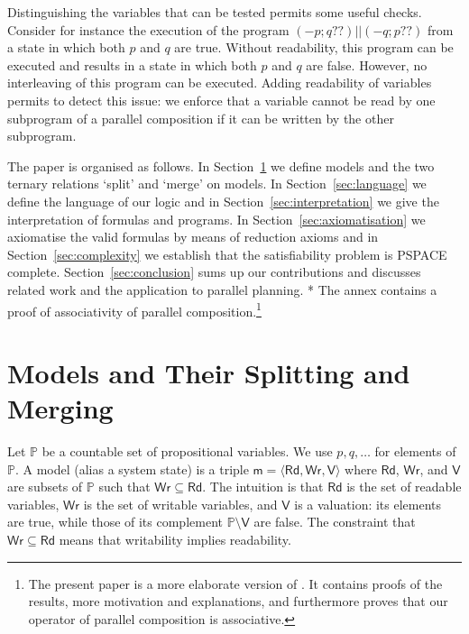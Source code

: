 \documentclass{llncs}
\newcommand{\atmset}{\mathtt{\mathbb X}}	%
\newcommand{\modl}{\mathsf m}
\newcommand{\pll}{ {||} }							%
\newcommand{\readable}[1]{\mathtt{r}_{#1}}
\newcommand{\readset}{\mathsf{Rd}}
\newcommand{\valuset}{\mathsf{V}}
\newcommand{\writable}[1]{\mathtt{w}_{#1}}
\newcommand{\writeset}{\mathsf{Wr}}
\newcommand{\testendo}{?\!\!?}			%
\newcommand{\ah}[1]{\**\marginpar{\textbf{AH:} #1}}
\newcommand{\assgnbotV}[1]{{\mathtt {-} #1}}
\newcommand{\propset}{\mathbb P}
\newcommand{\tuple}[1]{ \langle #1 \rangle}
\begin{document}
Distinguishing the variables that can be tested %
permits some useful checks.
Consider for instance the execution of the program $\left(\assgnbotV p ; q \testendo \right) \pll \left(\assgnbotV q ; p \testendo\right)$
from a state in which both $p$ and $q$ are true.
Without readability, this program can be executed and results in a state in which both $p$ and $q$ are false.
However, no interleaving of this program can be executed.
Adding readability of variables permits to detect this issue:
we enforce that a variable cannot be read by one subprogram of a parallel composition if it can be written by the other subprogram.

The paper is organised as follows.
In Section~\ref{sec:models} we define models and the two ternary relations `split' and `merge' on models. 
In Section~\ref{sec:language} we define the language of our logic and 
in Section~\ref{sec:interpretation} we give the interpretation of formulas and programs. 
In Section~\ref{sec:axiomatisation} we axiomatise the valid formulas by means of reduction axioms and
in Section~\ref{sec:complexity} we establish that the satisfiability problem is PSPACE complete. 
Section~\ref{sec:conclusion} sums up our contributions and discusses related work and the application to parallel planning. 
\ah{
reste ajoute
}
The annex contains a proof of associativity of parallel composition.\footnote{
The present paper is a more elaborate version of %
\cite{DBLP:conf/tap/BoudouHT19}. 
It contains proofs of the results, more motivation and explanations, and furthermore proves that our operator of parallel composition is associative. 
}


\section{Models and Their Splitting and Merging }\label{sec:models} 

Let $\propset$ be a countable set of propositional variables. 
We use $p, q,\ldots$ for elements of $\propset$. 
A model (alias a system state) is a %
triple $\modl = \tuple{\readset,\writeset,\valuset}$ 
where $\readset$, $\writeset$, and $\valuset$ are subsets of $\propset$ such that $\writeset \subseteq \readset$. 
The intuition is that $\readset$ is the set of readable variables, $\writeset$ is the set of writable variables, and $\valuset$ is a valuation: 
its elements are true, while those of its complement $\propset \setminus \valuset$ are false. 
The constraint that $\writeset \subseteq \readset$ means that writability implies readability. 
\end{document}
